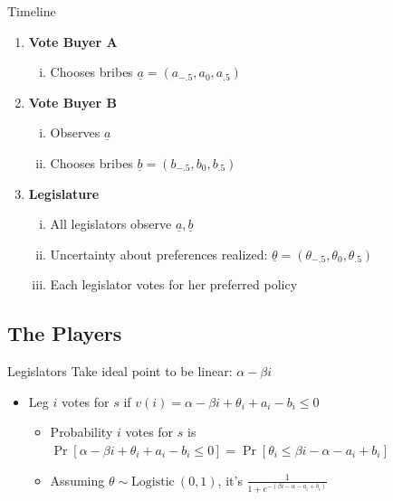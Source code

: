\documentclass{beamer}
\newcommand{\ta}{\theta}
\newcommand{\un}{\underline}
\begin{document}
\begin{frame}{Timeline}
\pause
\begin{enumerate}[<+->]
	\item {\bfseries Vote Buyer A}
		\begin{enumerate}[i.]
			\item Chooses bribes $\un{a} = \left(a_{-.5},a_0,a_{.5}\right)$
		\end{enumerate}
	\item \textbf{Vote Buyer B}
		\begin{enumerate}[i.]
			\item Observes $\un{a}$
			\item Chooses bribes $\un{b} = \left(b_{-.5},b_0,b_{.5}\right)$
		\end{enumerate}
	\item \textbf{Legislature}
		\begin{enumerate}[i.]
			\item All legislators observe $\un{a},\un{b}$
			\item Uncertainty about preferences realized: $\un{\ta} = \left(\ta_{-.5},\ta_0,\ta_{.5}\right)$
			\item Each legislator votes for her preferred policy 
		\end{enumerate}
\end{enumerate}
\end{frame}


\subsection{The Players}

\begin{frame}{Legislators}
\pause
Take ideal point to be linear: $\alpha - \beta i$
\pause
\begin{itemize}[<+->]
	\item Leg $i$ votes for $s$ if $v(i) = \alpha -\beta i + \ta_i + a_i - b_i \leq 0$
		\begin{itemize}
			\item Probability $i$ votes for $s$ is $\Pr\left[\alpha -\beta i + \ta_i + a_i - b_i \leq 0 \right] = \Pr\left[\ta_i \leq \beta i - \alpha - a_i + b_i \right] $
			\item Assuming $\ta \sim \text{Logistic} \ (0,1)$, it's $\frac{1}{1+e^{-\left(\beta i - \alpha - a_i + b_i \right)}}$ 
		\end{itemize}
\end{itemize}


\end{frame}
\end{document}
